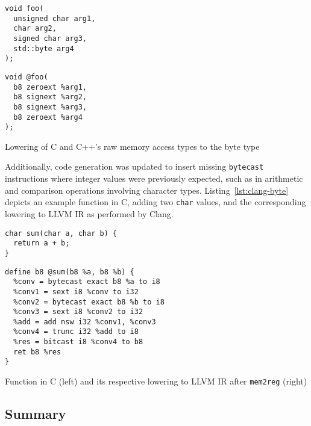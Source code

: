 \documentclass[a4paper,12pt]{article}
\begin{document}
\begin{listing}[h]
  \begin{minipage}{0.45\textwidth}
    \begin{verbatim}
void foo(
  unsigned char arg1,
  char arg2,
  signed char arg3,
  std::byte arg4
);
    \end{verbatim}
  \end{minipage}
  \begin{minipage}{0.45\textwidth}
    \begin{verbatim}
void @foo(
  b8 zeroext %arg1,
  b8 signext %arg2,
  b8 signext %arg3,
  b8 zeroext %arg4
);
    \end{verbatim}
  \end{minipage}
  \caption{Lowering of C and C++'s raw memory access types to the byte type}
  \label{lst:lowerings}
\end{listing}

Additionally, code generation was updated to insert missing \texttt{bytecast} instructions where integer values were previously expected, such as in arithmetic and comparison operations involving character types.
Listing~\ref{lst:clang-byte} depicts an example function in C, adding two \texttt{char} values, and the corresponding lowering to LLVM IR as performed by Clang.

\begin{listing}[h]
  \begin{minipage}{0.45\textwidth}
    \begin{verbatim}
char sum(char a, char b) {
  return a + b;
}
    \end{verbatim}
  \end{minipage}
  \begin{minipage}{0.45\textwidth}
    \begin{verbatim}
define b8 @sum(b8 %a, b8 %b) {
  %conv = bytecast exact b8 %a to i8
  %conv1 = sext i8 %conv to i32
  %conv2 = bytecast exact b8 %b to i8
  %conv3 = sext i8 %conv2 to i32
  %add = add nsw i32 %conv1, %conv3
  %conv4 = trunc i32 %add to i8
  %res = bitcast i8 %conv4 to b8
  ret b8 %res
}
    \end{verbatim}
  \end{minipage}
  \caption{Function in C (left) and its respective lowering to LLVM IR after \texttt{mem2reg} (right)}
  \label{lst:clang-byte}
\end{listing}

\subsection{Summary}
\end{document}

